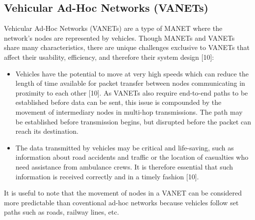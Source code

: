 \documentclass{article}
\begin{document}
\subsection{Vehicular Ad-Hoc Networks (VANETs)}
Vehicular Ad-Hoc Networks (VANETs) are a type of MANET where the network's nodes are represented by vehicles. Though MANETs and VANETs share many characteristics, there are unique challenges exclusive to VANETs that affect their usability, efficiency, and therefore their system design [10]:
\begin{itemize}
	\item Vehicles have the potential to move at very high speeds which can reduce the length of time available for packet transfer between nodes communicating in proximity to each other [10]. As VANETs also require end-to-end paths to be established before data can be sent, this issue is compounded by the movement of intermediary nodes in multi-hop transmissions. The path may be established before transmission begins, but disrupted before the packet can reach its destination.
	\item The data transmitted by vehicles may be critical and life-saving, such as information about road accidents and traffic or the location of casualties who need assistance from ambulance crews. It is therefore essential that such information is received correctly and in a timely fashion [10].
\end{itemize}
It is useful to note that the movement of nodes in a VANET can be considered more predictable than coventional ad-hoc networks because vehicles follow set paths such as roads, railway lines, etc.
\end{document}
